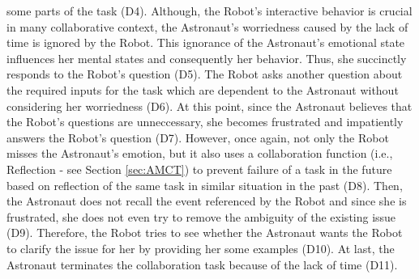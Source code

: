 some parts of the task (D4). Although, the Robot's interactive behavior is
crucial in many collaborative context, the Astronaut's worriedness caused by the
lack of time is ignored by the Robot. This ignorance of the Astronaut's
emotional state influences her mental states and consequently her behavior.
Thus, she succinctly responds to the Robot's question (D5). The Robot asks
another question about the required inputs for the task which are dependent
to the Astronaut without considering her worriedness (D6). At this point, since
the Astronaut believes that the Robot's questions are unneccessary, she becomes
frustrated and impatiently answers the Robot's question (D7). However, once
again, not only the Robot misses the Astronaut's emotion, but it also uses a
collaboration function (i.e., Reflection - see Section \ref{sec:AMCT}) to
prevent failure of a task in the future based on reflection of the same task in
similar situation in the past (D8). Then, the Astronaut does not recall the
event referenced by the Robot and since she is frustrated, she does not even
try to remove the ambiguity of the existing issue (D9). Therefore, the Robot
tries to see whether the Astronaut wants the Robot to clarify the issue for her
by providing her some examples (D10). At last, the Astronaut terminates the
collaboration task because of the lack of time (D11).\\

